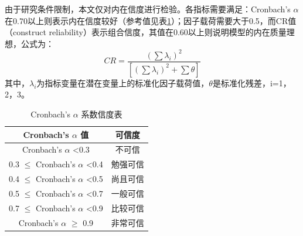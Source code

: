 \documentclass[12pt,UTF8]{ctexart}
\begin{document}
\begin{spacing}{1.25}
由于研究条件限制，本文仅对内在信度进行检验。各指标需要满足：Cronbach's $\alpha$在0.70以上则表示内在信度较好（参考值见表\ref{tab:cronbach}）；因子载荷需要大于0.5，而CR值（construct reliability）表示组合信度，其值在0.60以上则说明模型的内在质量理想，公式为：
\begin{equation}
    CR=\frac{\left (  \sum \lambda _{i}\right )^{2}}{\left [\left (  \sum \lambda _{i}\right )^{2}+\sum \theta   \right ]}
\end{equation}
其中，$\lambda _{i}$为指标变量在潜在变量上的标准化因子载荷值，$\theta$是标准化残差，i=1，2，3。
\begin{table}[H]
\centering
\caption{Cronbach's $\alpha$ 系数信度表}
\label{tab:cronbach}
\begin{tabular}{@{}cc@{}}
\toprule
\textbf{Cronbach's $\alpha$ 值}              & \textbf{可信度} \\ \midrule
Cronbach's $\alpha$ \textless 0.3           & 不可信          \\
0.3 $\leq$ Cronbach's $\alpha$ \textless 0.4 & 勉强可信         \\
0.4 $\leq$ Cronbach's $\alpha$ \textless 0.5 & 尚且可信         \\
0.5 $\leq$ Cronbach's $\alpha$ \textless 0.7 & 一般可信         \\
0.7 $\leq$ Cronbach's $\alpha$ \textless 0.9 & 比较可信         \\
Cronbach's $\alpha$ $\geq$ 0.9               & 非常可信         \\ \bottomrule
\end{tabular}
\end{table}


\end{spacing}
\end{document}
